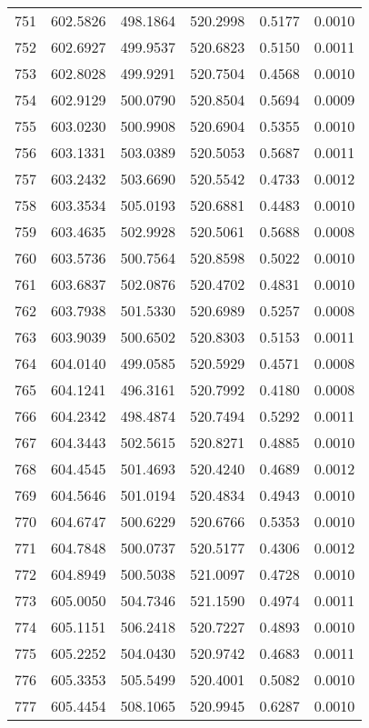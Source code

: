 \documentclass{article}
\begin{document}
\begin{longtable}{|c|c|c|c|c|c|}
751 & 602.5826 & 498.1864 & 520.2998 & 0.5177 & 0.0010 \\
752 & 602.6927 & 499.9537 & 520.6823 & 0.5150 & 0.0011 \\
753 & 602.8028 & 499.9291 & 520.7504 & 0.4568 & 0.0010 \\
754 & 602.9129 & 500.0790 & 520.8504 & 0.5694 & 0.0009 \\
755 & 603.0230 & 500.9908 & 520.6904 & 0.5355 & 0.0010 \\
756 & 603.1331 & 503.0389 & 520.5053 & 0.5687 & 0.0011 \\
757 & 603.2432 & 503.6690 & 520.5542 & 0.4733 & 0.0012 \\
758 & 603.3534 & 505.0193 & 520.6881 & 0.4483 & 0.0010 \\
759 & 603.4635 & 502.9928 & 520.5061 & 0.5688 & 0.0008 \\
760 & 603.5736 & 500.7564 & 520.8598 & 0.5022 & 0.0010 \\
761 & 603.6837 & 502.0876 & 520.4702 & 0.4831 & 0.0010 \\
762 & 603.7938 & 501.5330 & 520.6989 & 0.5257 & 0.0008 \\
763 & 603.9039 & 500.6502 & 520.8303 & 0.5153 & 0.0011 \\
764 & 604.0140 & 499.0585 & 520.5929 & 0.4571 & 0.0008 \\
765 & 604.1241 & 496.3161 & 520.7992 & 0.4180 & 0.0008 \\
766 & 604.2342 & 498.4874 & 520.7494 & 0.5292 & 0.0011 \\
767 & 604.3443 & 502.5615 & 520.8271 & 0.4885 & 0.0010 \\
768 & 604.4545 & 501.4693 & 520.4240 & 0.4689 & 0.0012 \\
769 & 604.5646 & 501.0194 & 520.4834 & 0.4943 & 0.0010 \\
770 & 604.6747 & 500.6229 & 520.6766 & 0.5353 & 0.0010 \\
771 & 604.7848 & 500.0737 & 520.5177 & 0.4306 & 0.0012 \\
772 & 604.8949 & 500.5038 & 521.0097 & 0.4728 & 0.0010 \\
773 & 605.0050 & 504.7346 & 521.1590 & 0.4974 & 0.0011 \\
774 & 605.1151 & 506.2418 & 520.7227 & 0.4893 & 0.0010 \\
775 & 605.2252 & 504.0430 & 520.9742 & 0.4683 & 0.0011 \\
776 & 605.3353 & 505.5499 & 520.4001 & 0.5082 & 0.0010 \\
777 & 605.4454 & 508.1065 & 520.9945 & 0.6287 & 0.0010 \\

\end{longtable}
\end{document}
